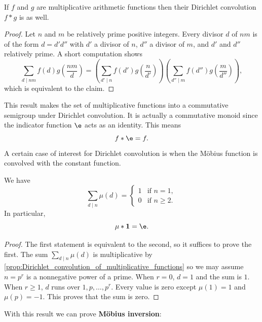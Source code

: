 \documentclass[12pt]{article}
\begin{document}
      \begin{proposition}\label{prop:Dirichlet_convolution_of_multiplicative_functions}
        If \(f\) and \(g\) are multiplicative arithmetic functions then their Dirichlet convolution \(f \ast g\) is as well.
      \end{proposition}
      \begin{proof}
        Let \(n\) and \(m\) be relatively prime positive integers. Every divisor \(d\) of \(nm\) is of the form \(d = d'd''\) with \(d'\) a divisor of \(n\), \(d''\) a divisor of \(m\), and \(d'\) and \(d''\) relatively prime. A short computation shows
        \[
          \sum_{d \mid nm}f(d)g\left(\frac{nm}{d}\right) = \left(\sum_{d' \mid n}f(d')g\left(\frac{n}{d'}\right)\right)\left(\sum_{d'' \mid m}f(d'')g\left(\frac{m}{d''}\right)\right),
        \]
        which is equivalent to the claim.
      \end{proof}

      This result makes the set of multiplicative functions into a commutative semigroup under Dirichlet convolution. It is actually a commutative monoid since the indicator function \(\e\) acts as an identity. This means
      \[
        f \ast \e = f.
      \]
      A certain case of interest for Dirichlet convolution is when the M\"obius function is convolved with the constant function.

      \begin{proposition}\label{prop:Mobius_indicator}
      We have
      \[
        \sum_{d \mid n}\mu(d) = \begin{cases} 1 & \text{if \(n = 1\)}, \\ 0 & \text{if \(n \ge 2\)}. \end{cases}
      \]
      In particular,
      \[
        \mu \ast \mathbf{1} = \e.
      \]
      \end{proposition}
      \begin{proof}
        The first statement is equivalent to the second, so it suffices to prove the first. The sum \(\sum_{d \mid n}\mu(d)\) is multiplicative by \cref{prop:Dirichlet_convolution_of_multiplicative_functions} so we may assume \(n = p^{r}\) is a nonnegative power of a prime. When \(r = 0\), \(d = 1\) and the sum is \(1\). When \(r \ge 1\), \(d\) runs over \(1,p,\ldots,p^{r}\). Every value is zero except \(\mu(1) = 1\) and \(\mu(p) = -1\). This proves that the sum is zero.
      \end{proof}

      With this result we can prove \textbf{M\"obius inversion}:
\end{document}

